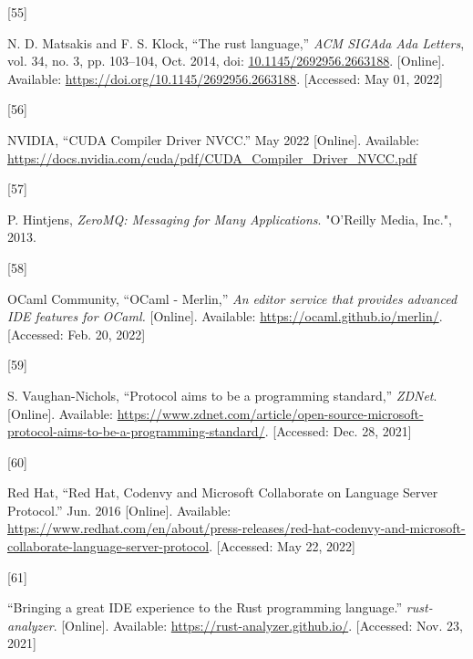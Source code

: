 \documentclass[
  a4paper,
  bibtex,
  english,
  nomenclature]{kthlatex/kththesis/kththesis}
\newlength{\cslhangindent}
\newlength{\csllabelwidth}
\newlength{\cslentryspacingunit} %
\newenvironment{CSLReferences}[2] %
 {%
  \setlength{\parindent}{0pt}
  \ifodd #1
  \let\oldpar\par
  \def\par{\hangindent=\cslhangindent\oldpar}
  \fi
  \setlength{\parskip}{#2\cslentryspacingunit}
 }%
 {}
\newcommand{\CSLLeftMargin}[1]{\parbox[t]{\csllabelwidth}{#1}}
\newcommand{\CSLRightInline}[1]{\parbox[t]{\linewidth - \csllabelwidth}{#1}\break}
\begin{document}
\begin{CSLReferences}{0}{0}
\leavevmode{}%
\CSLLeftMargin{{[}55{]} }
\CSLRightInline{N. D. Matsakis and F. S. Klock, {``The rust language,''}
\emph{ACM SIGAda Ada Letters}, vol. 34, no. 3, pp. 103--104, Oct. 2014,
doi:
\href{https://doi.org/10.1145/2692956.2663188}{10.1145/2692956.2663188}.
{[}Online{]}. Available: \url{https://doi.org/10.1145/2692956.2663188}.
{[}Accessed: May 01, 2022{]}}

\leavevmode{}%
\CSLLeftMargin{{[}56{]} }
\CSLRightInline{NVIDIA, {``{CUDA Compiler Driver NVCC}.''} May 2022
{[}Online{]}. Available:
\url{https://docs.nvidia.com/cuda/pdf/CUDA_Compiler_Driver_NVCC.pdf}}

\leavevmode{}%
\CSLLeftMargin{{[}57{]} }
\CSLRightInline{P. Hintjens, \emph{{ZeroMQ}: {Messaging} for {Many
Applications}}. {"O'Reilly Media, Inc."}, 2013. }

\leavevmode{}%
\CSLLeftMargin{{[}58{]} }
\CSLRightInline{OCaml Community, {``{OCaml} - {Merlin},''} \emph{An
editor service that provides advanced IDE features for OCaml.}
{[}Online{]}. Available: \url{https://ocaml.github.io/merlin/}.
{[}Accessed: Feb. 20, 2022{]}}

\leavevmode{}%
\CSLLeftMargin{{[}59{]} }
\CSLRightInline{S. Vaughan-Nichols, {``Protocol aims to be a programming
standard,''} \emph{ZDNet}. {[}Online{]}. Available:
\url{https://www.zdnet.com/article/open-source-microsoft-protocol-aims-to-be-a-programming-standard/}.
{[}Accessed: Dec. 28, 2021{]}}

\leavevmode{}%
\CSLLeftMargin{{[}60{]} }
\CSLRightInline{Red Hat, {``Red {Hat}, {Codenvy} and {Microsoft
Collaborate} on {Language Server Protocol}.''} Jun. 2016 {[}Online{]}.
Available:
\url{https://www.redhat.com/en/about/press-releases/red-hat-codenvy-and-microsoft-collaborate-language-server-protocol}.
{[}Accessed: May 22, 2022{]}}

\leavevmode{}%
\CSLLeftMargin{{[}61{]} }
\CSLRightInline{{``Bringing a great {IDE} experience to the {Rust}
programming language.''} \emph{rust-analyzer}. {[}Online{]}. Available:
\url{https://rust-analyzer.github.io/}. {[}Accessed: Nov. 23, 2021{]}}


\end{CSLReferences}
\end{document}
